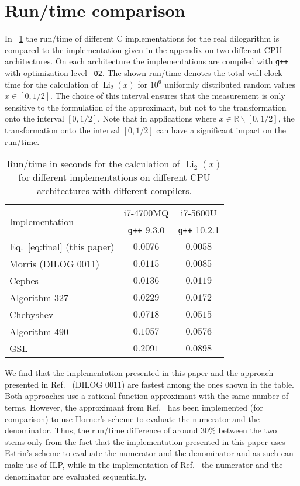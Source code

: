 \documentclass[10pt,DIV=16,twocolumn,numbers=noenddot]{scrartcl}
\newcommand{\Li}{\operatorname{Li}_2}
\newcommand{\tabref}[1]{\tablename~\ref{#1}}
\begin{document}
\section{Run\-/time comparison}

In \tabref{tab:runtime} the run\-/time of different C implementations
for the real dilogarithm is compared to the implementation given in
the appendix on two different CPU architectures.  On each architecture
the implementations are compiled with \texttt{g++} with optimization
level \texttt{-O2}.  The shown run\-/time denotes the total wall clock
time for the calculation of $\Li(x)$ for $10^6$ uniformly distributed
random values $x\in[0,1/2]$.  The choice of this interval ensures that
the measurement is only sensitive to the formulation of the
approximant, but not to the transformation onto the interval
$[0,1/2]$.  Note that in applications where
$x\in\mathbb{R}\backslash [0,1/2]$, the transformation onto the
interval $[0,1/2]$ can have a significant impact on the run\-/time.

\begin{table}[tb]
  \centering
  \caption{Run\-/time in seconds for the calculation of $\Li(x)$ for
    different implementations on different CPU architectures with
    different compilers.}
  \begin{tabular}{lcc}
    \toprule
    \multirow{2}{*}{Implementation} & i7-4700MQ & i7-5600U \\
    & \texttt{g++} 9.3.0 & \texttt{g++} 10.2.1 \\
    \midrule
    Eq.~\eqref{eq:final} (this paper) & $0.0076$ & $0.0058$ \\
    Morris (DILOG 0011) \cite{morris} & $0.0115$ & $0.0085$ \\
    Cephes \cite{cephes}              & $0.0136$ & $0.0119$ \\
    Algorithm 327 \cite{koelbigDilog} & $0.0229$ & $0.0172$ \\
    Chebyshev \cite{luke,root}        & $0.0718$ & $0.0515$ \\
    Algorithm 490 \cite{ginsberg}     & $0.1057$ & $0.0576$ \\
    GSL \cite{gsl}                    & $0.2091$ & $0.0898$ \\
    \bottomrule
  \end{tabular}
  \label{tab:runtime}
\end{table}%

We find that the implementation presented in this paper and the
approach presented in Ref.~\cite{morris} (DILOG 0011) are fastest
among the ones shown in the table.  Both approaches use a rational
function approximant with the same number of terms.  However, the
approximant from Ref.~\cite{morris} has been implemented (for
comparison) to use Horner's scheme to evaluate the numerator and the
denominator.  Thus, the run\-/time difference of around $30\%$ between
the two stems only from the fact that the implementation presented in
this paper uses Estrin's scheme to evaluate the numerator and the
denominator and as such can make use of ILP, while in the
implementation of Ref.~\cite{morris} the numerator and the denominator
are evaluated sequentially.
\end{document}
